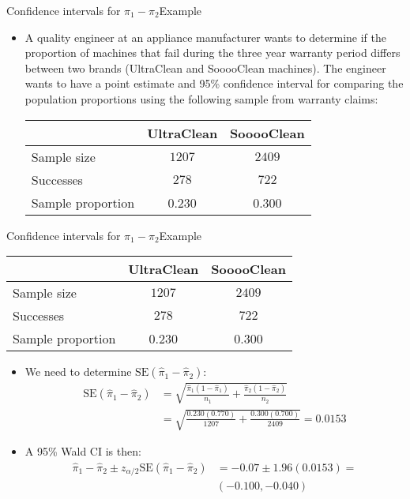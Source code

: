 \documentclass[xcolor=dvipsnames]{beamer}
\begin{document}
\begin{frame}{Confidence intervals for $\pi_1 - \pi_2$}{Example}
	\begin{itemize}
		\item A quality engineer at an appliance manufacturer wants to determine if the proportion of machines that fail during the three year warranty period differs between two brands (UltraClean and SooooClean machines). The engineer wants to have a point estimate and 95\% confidence interval for comparing the population proportions using the following sample from warranty claims:  \pause
		\vspace{3mm}
		\begin{center}
			\begin{tabular}{lcc}
				\hline
				& UltraClean & SooooClean \\ \hline
				Sample size & $1207$ & $2409$ \\
				Successes & $278$ & $722$ \\
				Sample proportion & 0.230 & 0.300 \\ \hline
			\end{tabular}
		\end{center}
	\end{itemize}
\end{frame}

\begin{frame}{Confidence intervals for $\pi_1 - \pi_2$}{Example}
	{\tiny
		\begin{center}
			\begin{tabular}{lcc}
				\hline
				& UltraClean & SooooClean \\ \hline
				Sample size & $1207$ & $2409$ \\
				Successes & $278$ & $722$ \\
				Sample proportion & 0.230 & 0.300 \\ \hline
			\end{tabular}
\end{center}} \pause
	\begin{itemize}
		\item We need to determine $\text{SE}(\hat{\pi}_1-\hat{\pi}_2)$:  \pause
		\begin{align*}
		\text{SE}(\hat{\pi}_1-\hat{\pi}_2) &= \sqrt{\frac{\hat{\pi}_1 (1-\hat{\pi}_1)}{n_1}+\frac{\hat{\pi}_2 (1-\hat{\pi}_2)}{n_2}} \\ &=\sqrt{\frac{0.230 (0.770)}{1207}+\frac{0.300 (0.700)}{2409}} = 0.0153
		\end{align*}  \pause
		\item A 95\% Wald CI is then:  \pause
		\begin{align*}
			\hat{\pi}_1 - \hat{\pi}_2 \pm z_{\alpha/2}\text{SE}(\hat{\pi}_1-\hat{\pi}_2) &= -0.07 \pm 1.96 (0.0153) =\\& (-0.100, -0.040)
		\end{align*}
	\end{itemize}
\end{frame}
\end{document}
